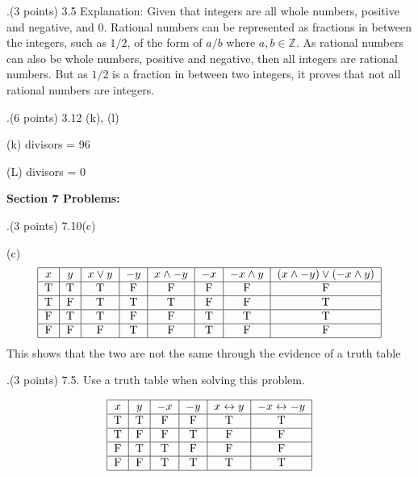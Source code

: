 \documentclass[12pt]{article}
\begin{document}
.(3 points) 3.5
\vspace{.15in}
\newline
Explanation: Given that integers are all whole numbers, positive and negative, and 0. Rational numbers can be represented as fractions in between the integers, such as $1/2$, of the form of $a/b$ where $a,b \in \mathbb{Z}$. As rational numbers can also be whole numbers, positive and negative, then all integers are rational numbers. But as $1/2$ is a fraction in between two integers, it proves that not all rational numbers are integers. 
\vspace{0.25in}

.(6 points) 3.12  (k), (l)
\vspace{.25in}

(k) divisors = 96

(L) divisors = 0 

\vspace{.25in}



\noindent \textbf{Section 7 Problems:} 
\vspace{.15in}

.(3 points) 7.10(c)    
\vspace{.15in}

(c) 
\[ %
\begin{tabular}{|c|c|c|c|c|c|c|c|} 
\hline %
$x$ & $y$ & $x\vee y$ & $-y$ & $x\wedge -y$ & $-x$ & $-x\wedge y$ & $(x \wedge -y) \vee (-x \wedge y)$ \\ 
\hline
T&T&T&F&F&F&F&F \\
\hline 
T&F&T&T&T&F&F&T\\
\hline
F&T&T&F&F&T&T&T\\
\hline
F&F&F&T&F&T&F&F \\
\hline
\end{tabular} %
\] %
This shows that the two are not the same through the evidence of a truth table 
\vspace{0.25in}



.(3 points) 7.5.  Use a truth table when solving this problem.      
\vspace{.15in}

\[ %
\begin{tabular}{|c|c|c|c|c|c|} 
\hline %
$x$ & $y$ & $-x$ & $-y$ & $x\leftrightarrow y$ & $-x \leftrightarrow -y$ \\ 
\hline
T&T&F&F&T&T \\
\hline 
T&F&F&T&F&F \\
\hline
F&T&T&F&F&F \\
\hline
F&F&T&T&T&T \\
\hline
\end{tabular} %
\] %
\end{document}
